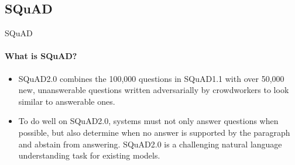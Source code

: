 \documentclass{beamer}
\begin{document}
\subsection{SQuAD}
\begin{frame}{SQuAD}


{
\framesubtitle{What is SQuAD?}

\begin{itemize}

 \item<2-> SQuAD2.0 combines the 100,000 questions in SQuAD1.1 with over 50,000 new, unanswerable questions written adversarially by crowdworkers to look similar to answerable ones.
 \item<3-> To do well on SQuAD2.0, systems must not only answer questions when possible, but also determine when no answer is supported by the paragraph and abstain from answering. SQuAD2.0 is a challenging natural language understanding task for existing models.
\end{itemize}
}



\end{frame}
\end{document}
